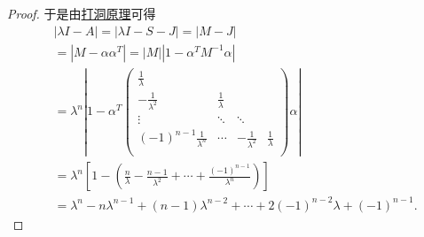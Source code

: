 \documentclass[../../main.tex]{subfiles}
\begin{document}
\begin{proof}
于是由\hyperref[proposition:打洞原理]{打洞原理}可得
\begin{align*}
&\left| \lambda I-A \right|=\left| \lambda I-S-J \right|=\left| M-J \right|
\\
&=\left| M-\alpha \alpha ^T \right|=\left| M \right|\left| 1-\alpha ^TM^{-1}\alpha \right|
\\
&=\lambda^n\left| 1-\alpha ^T\left( \begin{matrix}
\frac{1}{\lambda}&		&		&		\\
-\frac{1}{\lambda^2}&		\frac{1}{\lambda}&		&		\\
\vdots&		\ddots&		\ddots&		\\
(-1)^{n-1}\frac{1}{\lambda^n}&		\cdots&		-\frac{1}{\lambda^2}&		\frac{1}{\lambda}\\
\end{matrix} \right) \alpha \right|
\\
&=\lambda^n\left[ 1-\left( \frac{n}{\lambda}-\frac{n-1}{\lambda^2}+\cdots +\frac{\left( -1 \right) ^{n-1}}{\lambda^n} \right) \right] 
\\
&=\lambda^n-n\lambda^{n-1}+\left( n-1 \right) \lambda^{n-2}+\cdots +2\left( -1 \right) ^{n-2}\lambda+\left( -1 \right) ^{n-1}.
\end{align*}

\end{proof}
\end{document}
